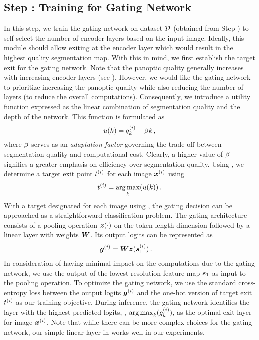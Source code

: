 \subsection{Step \stepC: Training for Gating Network}
\label{sec:gating}
In this step, we train the gating network on dataset $\mathcal{D}$ (obtained from Step \stepB) to self-select the number of encoder layers based on the input image. Ideally, this module should allow exiting at the encoder layer which would result in the highest quality segmentation map. With this in mind, we first establish the target exit for the gating network. Note that the panoptic quality generally increases with increasing encoder layers (see ). However, we would like the gating network to prioritize increasing the panoptic quality while also reducing the number of layers (to reduce the overall computations).  
Consequently, we introduce a utility function expressed as the linear combination of segmentation quality and the depth of the network. This function is formulated as
\begin{equation}
    u(k) = q_k^{(i)} - \beta k\,,
    \label{eq:utility_func}
\end{equation}
where $\beta$ serves as an \textit{adaptation factor} governing the trade-off between segmentation quality and computational cost. Clearly, a higher value of $\beta$ signifies a greater emphasis on efficiency over segmentation quality. Using , we determine a target exit point $t^{(i)}$ for each image ${\bm{x}}^{(i)}$ using 
\begin{equation}
    \label{eq:target}
    t^{(i)} = \operatorname*{arg\,max}_k (u(k))\,.
\end{equation}
With a target designated for each image using , the gating decision can be approached as a straightforward classification problem. The gating architecture consists of a pooling operation ${\bm{z}}(\cdot)$ on the token length dimension followed by a linear layer with weights ${\bm{W}}$. Its output logits can be represented as 
\begin{align}
    \label{eq:gating}
    {\bm{g}}^{(i)} &= {\bm{W}} {\bm{z}}(\bm{s}_1^{(i)})\,.
\end{align}
In consideration of having minimal impact on the computations due to the gating network, we use the output of the lowest resolution feature map $\bm{s}_1$ as input to the pooling operation. To optimize the gating network, we use the standard cross-entropy loss between the output logits ${\bm{g}}^{(i)}$ and the one-hot version of target exit $t^{(i)}$ as our training objective. During inference, the gating network identifies the layer with the highest predicted logits, \ie, $\operatorname*{arg\,max}_k(g_k^{(i)})$, as the optimal exit layer for image ${\bm{x}}^{(i)}$. Note that while there can be more complex choices for the gating network, our simple linear layer in  works well in our experiments.
%
